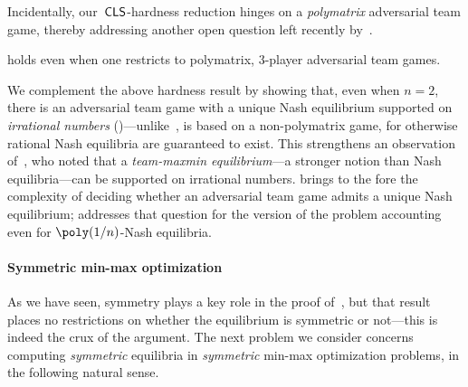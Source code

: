 Incidentally, our~$\mathsf{CLS}$-hardness reduction hinges on a \emph{polymatrix} adversarial team game, thereby addressing another open question left recently by~\citet{Hollender24:Complexity}.

\begin{theorem}
    \label{theorem:actual}
     holds even when one restricts to polymatrix, $3$-player adversarial team games.
\end{theorem}

We complement the above hardness result by showing that, even when $n = 2$, there is an adversarial team game with a unique Nash equilibrium supported on \emph{irrational numbers} ()---unlike~,  is based on a non-polymatrix game, for otherwise rational Nash equilibria are guaranteed to exist. This strengthens an observation of~\citet{Stengel97:Team}, who noted that a \emph{team-maxmin equilibrium}---a stronger notion than Nash equilibria---can be supported on irrational numbers.  brings to the fore the complexity of deciding whether an adversarial team game admits a unique Nash equilibrium;  addresses that question for the version of the problem accounting even for $\poly(1/n)$-Nash equilibria.


\paragraph{Symmetric min-max optimization} As we have seen, symmetry plays a key role in the proof of~, but that result places no restrictions on whether the equilibrium is symmetric or not---this is indeed the crux of the argument. The next problem we consider concerns computing \emph{symmetric} equilibria in \emph{symmetric} min-max optimization problems, in the following natural sense.

